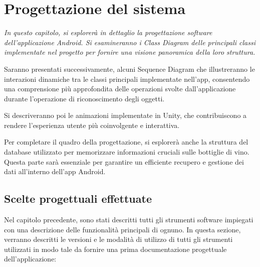 \chapter{Progettazione del sistema}

\begin{preamble}
{\em 
In questo capitolo, si esplorerà in dettaglio la progettazione software dell'applicazione Android. 
Si esamineranno i Class Diagram delle principali classi implementate nel progetto per fornire una visione panoramica della loro struttura.

Saranno presentati successivamente, alcuni Sequence Diagram che illustreranno le interazioni dinamiche tra le classi principali implementate nell'app, consentendo una comprensione più approfondita delle operazioni svolte dall'applicazione durante l'operazione di riconoscimento degli oggetti.

Si descriveranno poi le animazioni implementate in Unity, che contribuiscono a rendere l'esperienza utente più coinvolgente e interattiva.

Per completare il quadro della progettazione, si esplorerà anche la struttura del database utilizzato per memorizzare informazioni cruciali sulle bottiglie di vino. Questa parte sarà essenziale per garantire un efficiente recupero e gestione dei dati all'interno dell'app Android.
}
\end{preamble}

\section{Scelte progettuali effettuate}

Nel capitolo precedente, sono stati descritti tutti gli strumenti software impiegati con una descrizione delle funzionalità principali di ognuno. In questa sezione, verranno descritti le versioni e le modalità di utilizzo di tutti gli strumenti utilizzati in modo tale da fornire una prima documentazione progettuale dell'applicazione:


